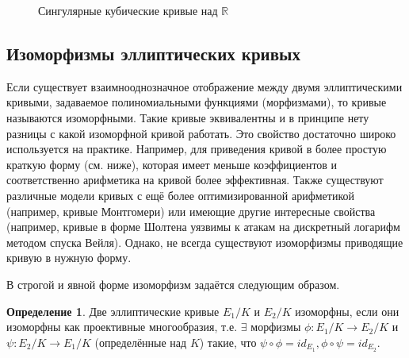 \documentclass[12pt]{article}
\newcommand{\R}{{{\mathbb R}}}
\theoremstyle{definition}
\newtheorem{definition}[theorem]{Определение}
\theoremstyle{definition}
\theoremstyle{definition}
\begin{document}
  \begin{figure}[h!]
	\centering
	\caption{Сингулярные кубические кривые над $\R$}
\end{figure}

\subsection{Изоморфизмы эллиптических кривых}
Если существует взаимнооднозначное отображение между двумя эллиптическими кривыми, задаваемое полиномиальными функциями (морфизмами), то кривые называются изоморфными. Такие кривые эквивалентны и в принципе нету разницы с какой изоморфной кривой работать. Это свойство достаточно широко используется на практике. Например, для приведения кривой в более простую краткую форму (см. ниже), которая имеет меньше коэффициентов и соответственно арифметика на кривой более эффективная. Также существуют различные модели кривых с ещё более оптимизированной арифметикой (например, кривые Монтгомери) или имеющие другие интересные свойства (например, кривые в форме Шолтена\cite{JouxVitse2012} уязвимы к атакам на дискретный логарифм методом спуска Вейля). Однако, не всегда существуют изоморфизмы приводящие кривую в нужную форму.

В строгой и явной форме изоморфизм задаётся следующим образом.
\begin{definition} 
Две эллиптические кривые $E_1/K$ и $E_2/K$ изоморфны, если они изоморфны как проективные многообразия, т.е. $\exists$ морфизмы $\phi: E_1/K \to E_2/K$ и $\psi: E_2/K \to E_1/K$ (определённые над $K$) такие, что $\psi \circ \phi = id_{E_1}, \phi \circ \psi = id_{E_2}$.
\end{definition}
\end{document}

